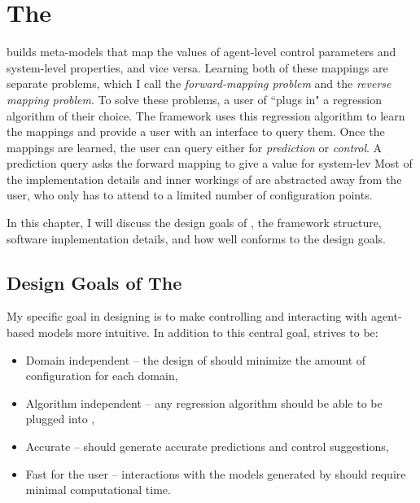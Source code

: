 \chapter{The \FRAMEWORK}
\thispagestyle{plain}

\label{Framework}

\framework builds meta-models that map the values of agent-level control parameters and system-level properties, and vice versa.
Learning both of these mappings are separate problems, which I call the \textit{forward-mapping problem} and the \textit{reverse mapping problem}.
To solve these problems, a user of \fw ``plugs in" a regression algorithm of their choice.
The framework uses this regression algorithm to learn the mappings and provide a user with an interface to query them.
Once the mappings are learned, the user can query either for \textit{prediction} or \textit{control}.
A prediction query asks the forward mapping to give a value for system-lev
Most of the implementation details and inner workings of \fw are abstracted away from the user, who only has to attend to a limited number of configuration points.

In this chapter, I will discuss the design goals of \fw, the framework structure, software implementation details, and how well \fw conforms to the design goals.


\section{Design Goals of The \framework}

My specific goal in designing \fw is to make controlling and interacting with agent-based models more intuitive.
In addition to this central goal, \fw strives to be:
\begin{itemize}
  \item Domain independent -- the design of \fw should minimize the amount of configuration for each domain,
  \item Algorithm independent -- any regression algorithm should be able to be plugged into \fw,
  \item Accurate -- \fw should generate accurate predictions and control suggestions,
  \item Fast for the user -- interactions with the models generated by \fw should require minimal computational time.
\end{itemize}

